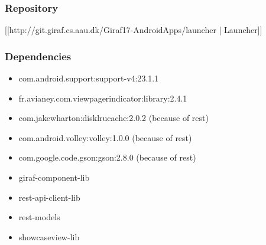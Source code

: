 \subsubsection{Repository}
[[http://git.giraf.cs.aau.dk/Giraf17-AndroidApps/launcher |
Launcher]]

\subsubsection{Dependencies}
\begin{itemize}
  \item com.android.support:support-v4:23.1.1
  \item fr.avianey.com.viewpagerindicator:library:2.4.1 
  \item com.jakewharton:disklrucache:2.0.2 (because of rest)
  \item com.android.volley:volley:1.0.0 (because of rest)
  \item com.google.code.gson:gson:2.8.0 (because of rest)
  \item giraf-component-lib
  \item rest-api-client-lib
  \item rest-models
  \item showcaseview-lib
\end{itemize}